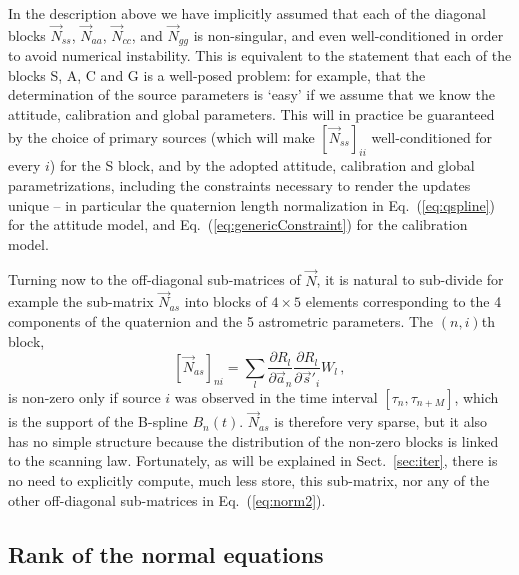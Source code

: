 \documentclass[structabstract]{aa}
\begin{document}
In the description above we have implicitly assumed that each of the
diagonal blocks $\vec{N}_{ss}$, $\vec{N}_{aa}$, $\vec{N}_{cc}$, and 
$\vec{N}_{gg}$ is non-singular, and even well-conditioned in order to
avoid numerical instability. This is equivalent to the statement that
each of the blocks S, A, C and G is a well-posed problem: for example,
that the determination of the source parameters is `easy' if we assume
that we know the attitude, calibration and global parameters.
This will in practice be guaranteed by the choice of primary sources
(which will make $[\vec{N}_{ss}]_{ii}$ well-conditioned 
for every $i$) for the S block, and 
by the adopted attitude, calibration and global parametrizations, 
including the constraints necessary to render the updates unique --
in particular the quaternion length normalization in Eq.~(\ref{eq:qspline})
for the attitude model, and Eq.~(\ref{eq:genericConstraint}) for the 
calibration model.

Turning now to the off-diagonal sub-matrices of $\vec{N}$, it is 
natural to sub-divide for example the sub-matrix $\vec{N}_{as}$
into blocks of $4\times 5$
elements corresponding to the 4 components of the quaternion and the
5 astrometric parameters. The $(n,i)$th block,
\begin{equation}\label{eq:Nas}
\left[\vec{N}_{as}\right]_{ni} = \sum_l
\frac{\partial R_l}{\partial\vec{a}_n}\frac{\partial R_l}{\partial\vec{s}'_{\!i}}
W_l \, ,
\end{equation}
is non-zero only if source $i$ was observed in the time interval
$[\tau_n,\tau_{n+M}]$, which is the support of the B-spline $B_n(t)$.
$\vec{N}_{as}$ is therefore very sparse, but it also has no simple
structure because the distribution of the non-zero blocks is linked to
the scanning law. Fortunately, as will be explained in Sect.~\ref{sec:iter}, there
is no need to explicitly compute, much less store, this sub-matrix, nor
any of the other off-diagonal sub-matrices in Eq.~(\ref{eq:norm2}).

\subsection{Rank of the normal equations}\label{sec:rank}
\end{document}

